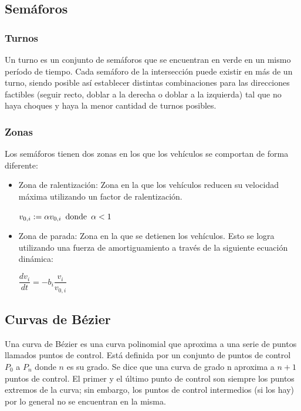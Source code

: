 \documentclass[colorinlistoftodos,twoside,twocolumn]{article} %
\begin{document}
	\subsection{Semáforos}
	
	\subsubsection{Turnos}
	
	Un turno es un conjunto de sem\'aforos que se encuentran en verde en un mismo per\'iodo de tiempo. Cada sem\'aforo de la intersecci\'on puede existir en m\'as de un turno, siendo posible as\'i establecer distintas combinaciones para las direcciones factibles (seguir recto, doblar a la derecha o doblar a la izquierda) tal que no haya choques y haya la menor cantidad de turnos posibles. 
	
	\subsubsection{Zonas}
	
	Los sem\'aforos tienen dos zonas en los que los veh\'iculos se comportan de forma diferente:
	\begin{itemize}
		\item Zona de ralentización: Zona en la que los vehículos reducen su velocidad máxima utilizando un factor de ralentización.
		\begin{center}
			$ v_{0,i} := \alpha v_{0,i} \hspace{0.5em} \text{donde} \hspace{0.5em} \alpha < 1$
		\end{center}
		\item Zona de parada: Zona en la que se detienen los vehículos. Esto se logra utilizando una fuerza de amortiguamiento a través de la siguiente ecuación dinámica:
		\begin{center}
			$ \dfrac{dv_{i}}{dt} = -b_{i} \dfrac{v_{i}}{v_{0,i}} $
		\end{center}
	\end{itemize}
	
	\subsection{Curvas de Bézier}
	
	Una curva de Bézier es una curva polinomial que aproxima a una serie de puntos llamados puntos de control. Est\'a definida por un conjunto de puntos de control $ P_{0} $ a $ P_{n} $ donde $ n $ es su grado. Se dice que una curva de grado n aproxima a $ n + 1 $ puntos de control. El primer y el último punto de control son siempre los puntos extremos de la curva; sin embargo, los puntos de control intermedios (si los hay) por lo general no se encuentran en la misma. 
	
\end{document}
